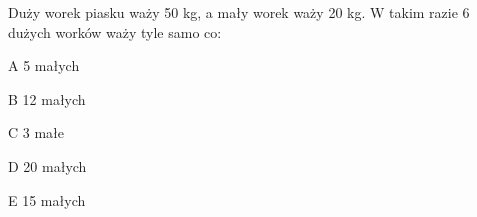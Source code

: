 \begin{tresc}
Duży worek piasku waży 50 kg, a mały worek waży 20 kg. W takim razie 6 dużych worków waży tyle samo co:
\end{tresc}
\begin{wariant}{A} 5 małych \end{wariant}
\begin{wariant}{B} 12 małych \end{wariant}
\begin{wariant}{C} 3 małe \end{wariant}
\begin{wariant}{D} 20 małych \end{wariant}
\begin{wariant}{E} 15 małych \end{wariant}
